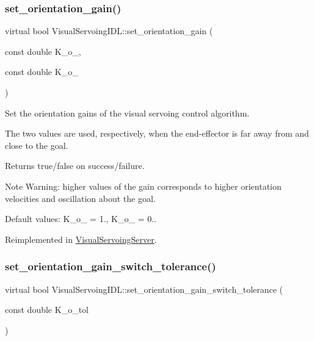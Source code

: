 \subsubsection{\texorpdfstring{set\+\_\+orientation\+\_\+gain()}{set\_orientation\_gain()}}
{\footnotesize\ttfamily virtual bool Visual\+Servoing\+I\+D\+L\+::set\+\_\+orientation\+\_\+gain (\begin{DoxyParamCaption}\item[{const double}]{K\+\_\+o\+\_,  }\item[{const double}]{K\+\_\+o\+\_ }\end{DoxyParamCaption})\hspace{0.3cm}{\ttfamily [virtual]}}



Set the orientation gains of the visual servoing control algorithm. 

The two values are used, respectively, when the end-\/effector is far away from and close to the goal. \begin{DoxyReturn}{Returns}
true/false on success/failure. 
\end{DoxyReturn}
\begin{DoxyNote}{Note}
Warning\+: higher values of the gain corresponds to higher orientation velocities and oscillation about the goal. 

Default values\+: K\+\_\+o\+\_ = 1., K\+\_\+o\+\_ = 0.. 
\end{DoxyNote}


Reimplemented in \hyperlink{classVisualServoingServer_a19bdb0b44a8b556bad599dc03fca5f3f}{Visual\+Servoing\+Server}.

\mbox{\label{classVisualServoingIDL_acaf4ad7fa8a2443d4719e3f56b8d72b0}} 
\subsubsection{\texorpdfstring{set\+\_\+orientation\+\_\+gain\+\_\+switch\+\_\+tolerance()}{set\_orientation\_gain\_switch\_tolerance()}}
{\footnotesize\ttfamily virtual bool Visual\+Servoing\+I\+D\+L\+::set\+\_\+orientation\+\_\+gain\+\_\+switch\+\_\+tolerance (\begin{DoxyParamCaption}\item[{const double}]{K\+\_\+o\+\_\+tol }\end{DoxyParamCaption})\hspace{0.3cm}{\ttfamily [virtual]}}



